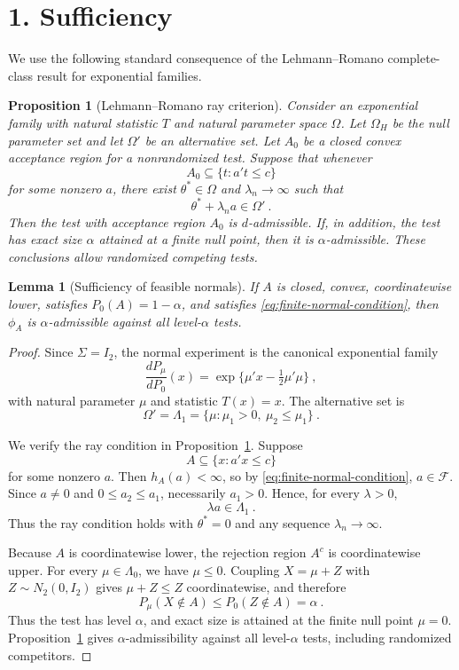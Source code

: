 \documentclass[12pt]{article}
\newtheorem{proposition}{Proposition}
\newtheorem{lemma}{Lemma}
\theoremstyle{remark}
\begin{document}
\section*{1. Sufficiency}

We use the following standard consequence of the Lehmann--Romano complete-class result for exponential families.

\begin{proposition}[Lehmann--Romano ray criterion]\label{prop:LR}
Consider an exponential family with natural statistic $T$ and natural parameter space $\Omega$.  Let $\Omega_H$ be the null parameter set and let $\Omega'$ be an alternative set.  Let $A_0$ be a closed convex acceptance region for a nonrandomized test.  Suppose that whenever
\[
A_0\subseteq\{t:a't\le c\}
\]
for some nonzero $a$, there exist $\theta^*\in\Omega$ and $\lambda_n\to\infty$ such that
\[
\theta^*+\lambda_n a\in\Omega'~.
\]
Then the test with acceptance region $A_0$ is $d$-admissible.  If, in addition, the test has exact size $\alpha$ attained at a finite null point, then it is $\alpha$-admissible.  These conclusions allow randomized competing tests.
\end{proposition}

\begin{lemma}[Sufficiency of feasible normals]\label{lem:sufficiency}
If $A$ is closed, convex, coordinatewise lower, satisfies $P_0(A)=1-\alpha$, and satisfies \eqref{eq:finite-normal-condition}, then $\phi_A$ is $\alpha$-admissible against all level-$\alpha$ tests.
\end{lemma}

\begin{proof}
Since $\Sigma=I_2$, the normal experiment is the canonical exponential family
\[
\frac{dP_\mu}{dP_0}(x)=\exp\{\mu'x-\tfrac12\mu'\mu\}~,
\]
with natural parameter $\mu$ and statistic $T(x)=x$.  The alternative set is
\[
\Omega'=\Lambda_1=\{\mu:\mu_1>0,\ \mu_2\le\mu_1\}~.
\]

We verify the ray condition in Proposition~\ref{prop:LR}.  Suppose
\[
A\subseteq\{x:a'x\le c\}
\]
for some nonzero $a$.  Then $h_A(a)<\infty$, so by \eqref{eq:finite-normal-condition}, $a\in\mathcal F$.  Since $a\ne0$ and $0\le a_2\le a_1$, necessarily $a_1>0$.  Hence, for every $\lambda>0$,
\[
\lambda a\in\Lambda_1~.
\]
Thus the ray condition holds with $\theta^*=0$ and any sequence $\lambda_n\to\infty$.

Because $A$ is coordinatewise lower, the rejection region $A^c$ is coordinatewise upper.  For every $\mu\in\Lambda_0$, we have $\mu\le0$.  Coupling $X=\mu+Z$ with $Z\sim N_2(0,I_2)$ gives $\mu+Z\le Z$ coordinatewise, and therefore
\[
P_\mu(X\notin A)\le P_0(Z\notin A)=\alpha~.
\]
Thus the test has level $\alpha$, and exact size is attained at the finite null point $\mu=0$.  Proposition~\ref{prop:LR} gives $\alpha$-admissibility against all level-$\alpha$ tests, including randomized competitors.
\end{proof}
\end{document}
